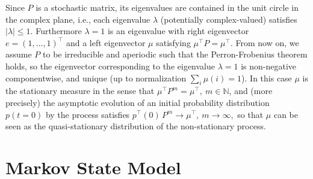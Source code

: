\documentclass[aps, pre, preprint,unsortedaddress,a4paper,onecolumn,showkeys]{revtex4}
\newcommand{\vect}[1]{#1}
\newcommand{\mymu}{\mu}
\begin{document}
Since $P$ is a stochastic matrix, its eigenvalues are contained in the unit circle in
the complex plane, i.e., each eigenvalue $\lambda$ (potentially complex-valued)
satisfies $|\lambda|\le 1$. Furthermore $\lambda=1$ is an
eigenvalue with right eigenvector $\vect e=(1,\ldots,1)^{\top}$ and a left eigenvector $\mymu$
satisfying
$\mymu^{\top}P=\mymu^{\top}$.
From now on, we assume $P$ to be irreducible and aperiodic such that the Perron-Frobenius theorem holds, so the eigenvector corresponding to the eigenvalue $\lambda=1$ is  non-negative componentwise, and unique (up to normalization $\sum_i\mu(i)=1$). In this case $\mymu$ is the stationary measure in the sense that
$
 \mymu^{\top} P^m = \mymu^{\top},\ m\in\mathbb N
$,
and (more precisely) the asymptotic evolution of an initial probability distribution $\vect p(t=0)$ by the process satisfies
$
\vect p^{\top}(0)\,P^m \to \mymu^{\top},\ m\to\infty,
$
so that $\mymu$ can be seen as the quasi-stationary distribution of the non-stationary process.



\section{Markov State Model}
\label{sec:build-msm}
\end{document}
